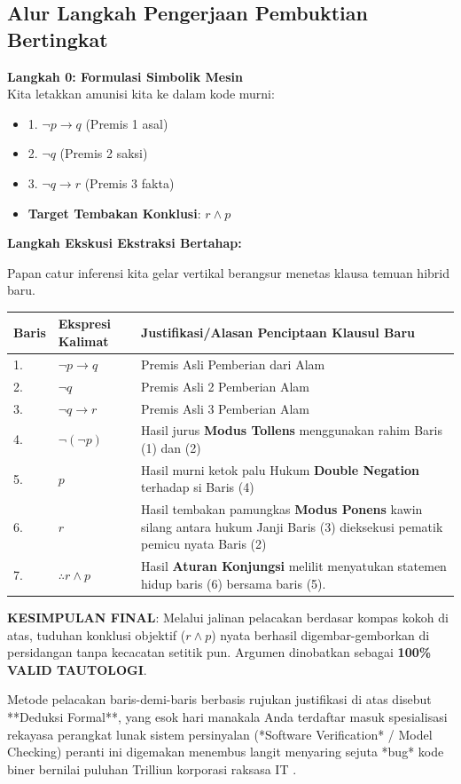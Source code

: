 \subsection{Alur Langkah Pengerjaan Pembuktian Bertingkat}

\textbf{Langkah 0: Formulasi Simbolik Mesin} \\
Kita letakkan amunisi kita ke dalam kode murni: 
\begin{itemize}
    \item 1. $\neg p \rightarrow q$ \quad (Premis 1 asal)
    \item 2. $\neg q$ \quad (Premis 2 saksi)
    \item 3. $\neg q \rightarrow r$ \quad (Premis 3 fakta)
    \item \textbf{Target Tembakan Konklusi}: \quad $r \land p$
\end{itemize}

\textbf{Langkah Ekskusi Ekstraksi Bertahap:}

Papan catur inferensi kita gelar vertikal berangsur menetas klausa temuan hibrid baru.
\begin{table}[h]
\centering
\begin{tabular}{|p{1cm}|p{3.5cm}|p{7cm}|}
\hline
\textbf{Baris} & \textbf{Ekspresi Kalimat} & \textbf{Justifikasi/Alasan Penciptaan Klausul Baru} \\
\hline
1. & $\neg p \rightarrow q$ & Premis Asli Pemberian dari Alam \\
2. & $\neg q$                 & Premis Asli 2 Pemberian Alam \\
3. & $\neg q \rightarrow r$   & Premis Asli 3 Pemberian Alam \\
\hline
4. & $\neg (\neg p)$          & Hasil jurus \textbf{Modus Tollens} menggunakan rahim Baris (1) dan (2) \\
5. & $p$                      & Hasil murni ketok palu Hukum \textbf{Double Negation} terhadap si Baris (4) \\
6. & $r$                      & Hasil tembakan pamungkas \textbf{Modus Ponens} kawin silang antara hukum Janji Baris (3) dieksekusi pematik pemicu nyata Baris (2) \\
\hline
7. & \textbf{$\therefore r \land p$} & Hasil \textbf{Aturan Konjungsi} melilit menyatukan statemen hidup baris (6) bersama baris (5). \\
\hline
\end{tabular}
\end{table}

\textbf{KESIMPULAN FINAL}: Melalui jalinan pelacakan berdasar kompas kokoh di atas, tuduhan konklusi objektif ($r \land p$) nyata berhasil digembar-gemborkan di persidangan tanpa kecacatan setitik pun. Argumen dinobatkan sebagai \textbf{100\% VALID TAUTOLOGI}. 

Metode pelacakan baris-demi-baris berbasis rujukan justifikasi di atas disebut **Deduksi Formal**, yang esok hari manakala Anda terdaftar masuk spesialisasi rekayasa perangkat lunak sistem persinyalan (*Software Verification* / Model Checking) peranti ini digemakan menembus langit menyaring sejuta *bug* kode biner bernilai puluhan Trilliun korporasi raksasa IT \cite{wiki_first_order_logic}.
